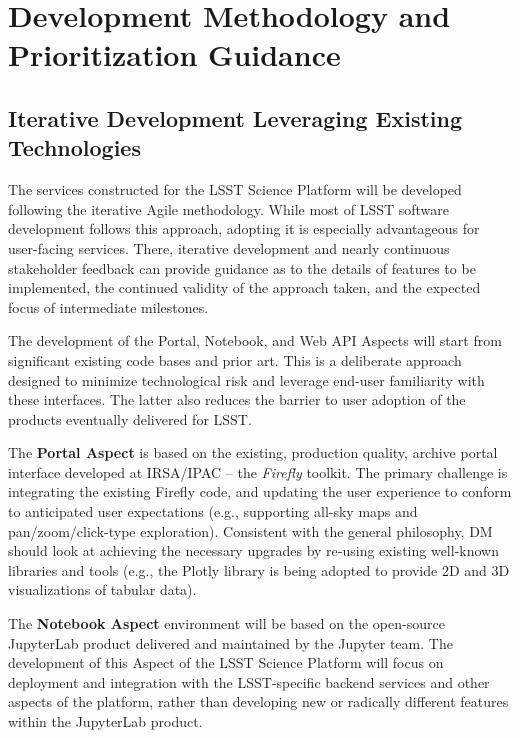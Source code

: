 \section{Development Methodology and Prioritization Guidance\label{sec:methdology}}

\subsection{Iterative Development Leveraging Existing Technologies }

The services constructed for the LSST Science Platform will be developed following the iterative Agile methodology. While most of LSST software development follows this approach, adopting it is especially advantageous for user-facing services. There, iterative development and nearly continuous stakeholder feedback can provide guidance as to the details of features to be implemented, the continued validity of the approach taken, and the expected focus of intermediate milestones.

The development of the Portal, Notebook, and Web API Aspects will start from significant existing code bases and prior art.
This is a deliberate approach designed to minimize technological risk and leverage end-user familiarity with these interfaces.
The latter also reduces the barrier to user adoption of the products eventually delivered for LSST.

The \textbf{Portal Aspect} is based on the existing, production quality, archive portal interface developed at IRSA/IPAC -- the \emph{Firefly} toolkit.
The primary challenge is integrating the existing Firefly code, and updating the user experience to conform to anticipated user expectations (e.g., supporting all-sky maps and pan/zoom/click-type exploration).
Consistent with the general philosophy, DM should look at achieving the necessary upgrades by re-using existing well-known libraries and tools (e.g., the Plotly library is being adopted to provide 2D and 3D visualizations of tabular data).

The \textbf{Notebook Aspect} environment will be based on the open-source JupyterLab product delivered and maintained by the Jupyter team.
The development of this Aspect of the LSST Science Platform will focus on deployment and integration with the LSST-specific backend services and other aspects of the platform, rather than developing new or radically different features within the JupyterLab product.

